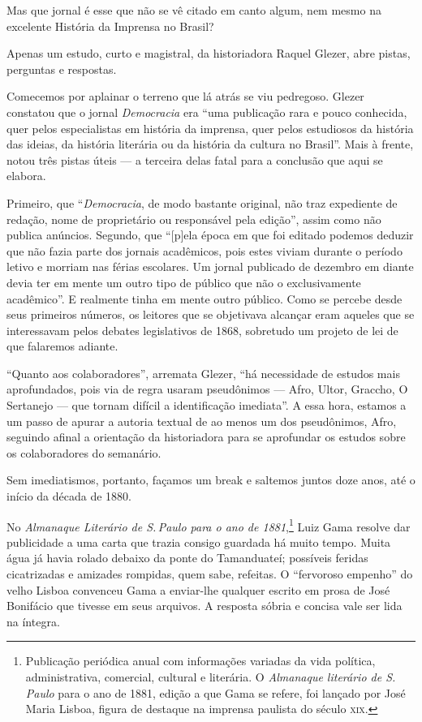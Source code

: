 Mas que jornal é esse que não se vê citado em canto algum, nem mesmo na
excelente História da Imprensa no Brasil?

Apenas um estudo, curto e magistral, da historiadora Raquel Glezer, abre
pistas, perguntas e respostas.

Comecemos por aplainar o terreno que lá atrás se viu pedregoso. Glezer
constatou que o jornal \emph{Democracia} era ``uma publicação rara e
pouco conhecida, quer pelos especialistas em história da imprensa, quer
pelos estudiosos da história das ideias, da história literária ou da
história da cultura no Brasil''. Mais à frente, notou três pistas úteis
--- a terceira delas fatal para a conclusão que aqui se elabora.

Primeiro, que ``\emph{Democracia}, de modo bastante original, não traz
expediente de redação, nome de proprietário ou responsável pela edição'',
assim como não publica anúncios. Segundo, que ``{[}p{]}ela época em que
foi editado podemos deduzir que não fazia parte dos jornais acadêmicos,
pois estes viviam durante o período letivo e morriam nas férias
escolares. Um jornal publicado de dezembro em diante devia ter em mente
um outro tipo de público que não o exclusivamente acadêmico''. E
realmente tinha em mente outro público. Como se percebe desde seus
primeiros números, os leitores que se objetivava alcançar eram aqueles
que se interessavam pelos debates legislativos de 1868, sobretudo um
projeto de lei de que falaremos adiante.

``Quanto aos colaboradores'', arremata Glezer, ``há necessidade de estudos
mais aprofundados, pois via de regra usaram pseudônimos --- Afro, Ultor,
Graccho, O Sertanejo --- que tornam difícil a identificação imediata''. A
essa hora, estamos a um passo de apurar a autoria textual de ao menos um
dos pseudônimos, Afro, seguindo afinal a orientação da historiadora para
se aprofundar os estudos sobre os colaboradores do semanário.

Sem imediatismos, portanto, façamos um break e saltemos juntos doze
anos, até o início da década de 1880.

No \emph{Almanaque Literário de S.\,Paulo para o ano de 1881},\footnote{Publicação periódica anual com informações variadas da vida política,
  administrativa, comercial, cultural e literária. O \emph{Almanaque
  literário de S.\,Paulo} para o ano de 1881, edição a que Gama se
  refere, foi lançado por José Maria Lisboa, figura de destaque na
  imprensa paulista do século \textsc{xix}.} Luiz Gama resolve dar publicidade a
uma carta que trazia consigo guardada há muito tempo. Muita água já
havia rolado debaixo da ponte do Tamanduateí; possíveis feridas
cicatrizadas e amizades rompidas, quem sabe, refeitas. O ``fervoroso
empenho'' do velho Lisboa convenceu Gama a enviar-lhe qualquer escrito em
prosa de José Bonifácio que tivesse em seus arquivos. A resposta sóbria
e concisa vale ser lida na íntegra.

